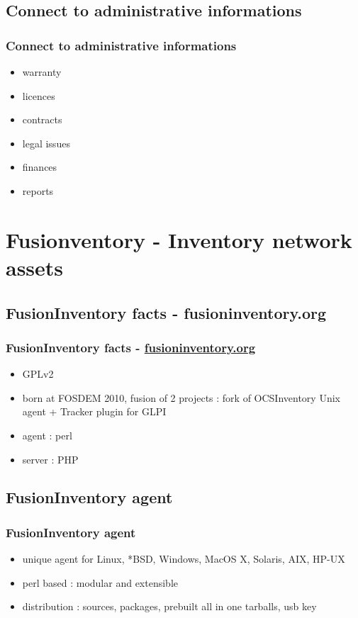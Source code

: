 \documentclass{beamer}
\begin{document}
\subsection{Connect to administrative informations}
\begin{frame}
\frametitle{Connect to administrative informations}
%
\begin{itemize}
%
\item warranty
\item licences
\item contracts
\item legal issues
\item finances
\item reports
%
\end{itemize}
\end{frame}
\section{Fusionventory - Inventory network assets}
%
%
\subsection{FusionInventory facts - fusioninventory.org}
\begin{frame}
\frametitle{FusionInventory facts - \href{http://fusioninventory.org}{fusioninventory.org}}
%
\begin{itemize}
\item GPLv2
\item born at FOSDEM 2010, fusion of 2 projects : fork of OCSInventory Unix agent + Tracker plugin for GLPI
\item agent : perl
\item server : PHP
%
\end{itemize}
\end{frame}
\subsection{FusionInventory agent}
\begin{frame}
\frametitle{FusionInventory agent}
%
\begin{itemize}
%
\item unique agent for Linux, *BSD, Windows, MacOS X, Solaris, AIX, HP-UX
\item perl based : modular and extensible
\item distribution : sources, packages, prebuilt all in one tarballs, usb key
%
\end{itemize}
\end{frame}
\end{document}
